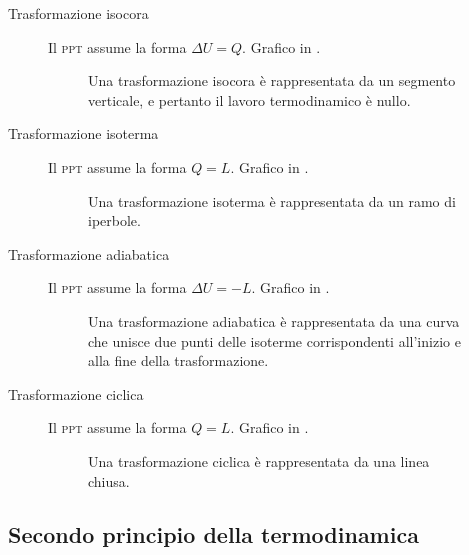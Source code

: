 \documentclass[a4paper,11pt,italian]{article}
\begin{document}
\begin{description}
  \item[Trasformazione isocora] 
  Il \textsc{ppt} assume la forma $ \Delta U = Q $. Grafico in .

\begin{figure}[htp]\centering

\caption{Una trasformazione isocora è rappresentata da un segmento verticale, e pertanto il lavoro termodinamico è nullo.}
\label{img:isocora}
\end{figure}

  \item[Trasformazione isoterma] 
  Il \textsc{ppt} assume la forma $ Q = L $. Grafico in .

\begin{figure}[htp]\centering

\caption{Una trasformazione isoterma è rappresentata da un ramo di iperbole.}
\label{img:isoterma}
\end{figure}

  \item[Trasformazione adiabatica] 
  Il \textsc{ppt} assume la forma $ \Delta U = - L $. Grafico in .

\begin{figure}[htp]\centering

\caption{Una trasformazione adiabatica è rappresentata da una curva che unisce due punti delle isoterme corrispondenti all'inizio e alla fine della trasformazione.}
\label{img:adiabatica}
\end{figure}

  \item[Trasformazione ciclica] 
  Il \textsc{ppt} assume la forma  $ Q = L $. Grafico in .

\begin{figure}[htp]\centering

\caption{Una trasformazione ciclica è rappresentata da una linea chiusa.}
\label{img:ciclica}
\end{figure}
\end{description}

\subsection{Secondo principio della termodinamica}
\end{document}
